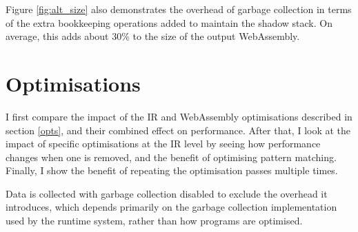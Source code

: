 Figure \ref{fig:alt_size} also demonstrates the overhead of garbage collection in terms of the extra bookkeeping operations added to maintain the shadow stack. %
On average, this adds about 30\% to the size of the output WebAssembly. %

\section{Optimisations}

I first compare the impact of the IR and WebAssembly optimisations described in section \ref{opts}, and their combined effect on performance. After that, I look at the impact of specific optimisations at the IR level by seeing how performance changes when one is removed, and the benefit of optimising pattern matching. Finally, I show the benefit of repeating the optimisation passes multiple times. %

Data is collected with garbage collection disabled to exclude the overhead it introduces, which depends primarily on the garbage collection implementation used by the runtime system, rather than how programs are optimised.

